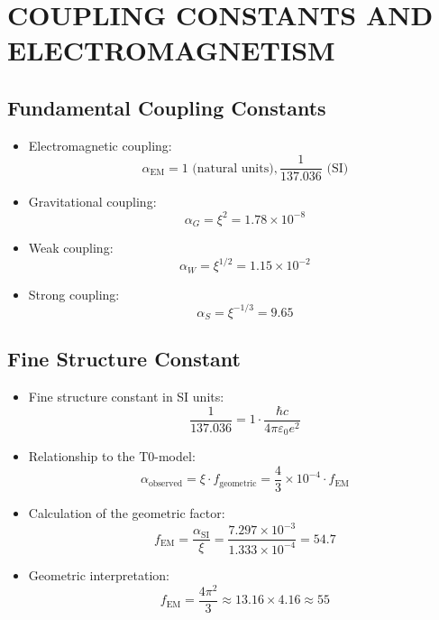 \documentclass[12pt,a4paper]{article}
\begin{document}
	\section{COUPLING CONSTANTS AND ELECTROMAGNETISM}
	
	\subsection{Fundamental Coupling Constants}
	\begin{itemize}
		\item Electromagnetic coupling:
		\begin{equation}
			\alpha_{\text{EM}} = 1 \text{ (natural units)}, \frac{1}{137.036} \text{ (SI)}
		\end{equation}
		
		\item Gravitational coupling:
		\begin{equation}
			\alpha_G = \xi^2 = 1.78 \times 10^{-8}
		\end{equation}
		
		\item Weak coupling:
		\begin{equation}
			\alpha_W = \xi^{1/2} = 1.15 \times 10^{-2}
		\end{equation}
		
		\item Strong coupling:
		\begin{equation}
			\alpha_S = \xi^{-1/3} = 9.65
		\end{equation}
	\end{itemize}
	
	\subsection{Fine Structure Constant}
	\begin{itemize}
		\item Fine structure constant in SI units:
		\begin{equation}
			\frac{1}{137.036} = 1 \cdot \frac{\hbar c}{4\pi\varepsilon_0 e^2}
		\end{equation}
		
		\item Relationship to the T0-model:
		\begin{equation}
			\alpha_{\text{observed}} = \xi \cdot f_{\text{geometric}} = \frac{4}{3} \times 10^{-4} \cdot f_{\text{EM}}
		\end{equation}
		
		\item Calculation of the geometric factor:
		\begin{equation}
			f_{\text{EM}} = \frac{\alpha_{\text{SI}}}{\xi} = \frac{7.297 \times 10^{-3}}{1.333 \times 10^{-4}} = 54.7
		\end{equation}
		
		\item Geometric interpretation:
		\begin{equation}
			f_{\text{EM}} = \frac{4\pi^2}{3} \approx 13.16 \times 4.16 \approx 55
		\end{equation}
	\end{itemize}
	
\end{document}
